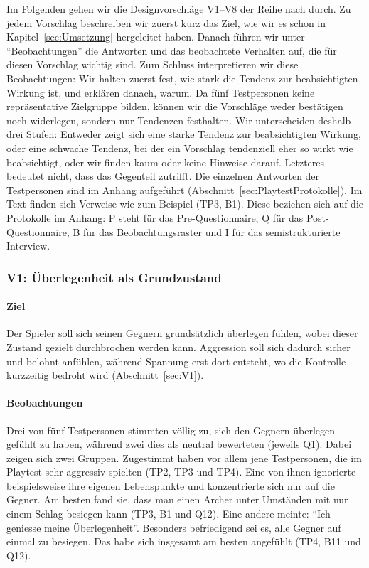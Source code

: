 \documentclass[../Main.tex]{subfiles}
\begin{document}
Im Folgenden gehen wir die Designvorschläge V1--V8 der Reihe nach durch. Zu jedem Vorschlag beschreiben wir zuerst kurz das Ziel, wie wir es schon in Kapitel~\ref{sec:Umsetzung} hergeleitet haben. Danach führen wir unter \enquote{Beobachtungen} die Antworten und das beobachtete Verhalten auf, die für diesen Vorschlag wichtig sind. Zum Schluss interpretieren wir diese Beobachtungen: Wir halten zuerst fest, wie stark die Tendenz zur beabsichtigten Wirkung ist, und erklären danach, warum. Da fünf Testpersonen keine repräsentative Zielgruppe bilden, können wir die Vorschläge weder bestätigen noch widerlegen, sondern nur Tendenzen festhalten. Wir unterscheiden deshalb drei Stufen: Entweder zeigt sich eine starke Tendenz zur beabsichtigten Wirkung, oder eine schwache Tendenz, bei der ein Vorschlag tendenziell eher so wirkt wie beabsichtigt, oder wir finden kaum oder keine Hinweise darauf. Letzteres bedeutet nicht, dass das Gegenteil zutrifft. Die einzelnen Antworten der Testpersonen sind im Anhang aufgeführt (Abschnitt~\ref{sec:PlaytestProtokolle}). Im Text finden sich Verweise wie zum Beispiel (TP3, B1). Diese beziehen sich auf die Protokolle im Anhang: P steht für das Pre-Questionnaire, Q für das Post-Questionnaire, B für das Beobachtungsraster und I für das semistrukturierte Interview.

\subsubsection{V1: Überlegenheit als Grundzustand}

\paragraph{Ziel}
Der Spieler soll sich seinen Gegnern grundsätzlich überlegen fühlen, wobei dieser Zustand gezielt durchbrochen werden kann. Aggression soll sich dadurch sicher und belohnt anfühlen, während Spannung erst dort entsteht, wo die Kontrolle kurzzeitig bedroht wird (Abschnitt~\ref{sec:V1}).

\paragraph{Beobachtungen}
Drei von fünf Testpersonen stimmten völlig zu, sich den Gegnern überlegen gefühlt zu haben, während zwei dies als neutral bewerteten (jeweils Q1). Dabei zeigen sich zwei Gruppen. Zugestimmt haben vor allem jene Testpersonen, die im Playtest sehr aggressiv spielten (TP2, TP3 und TP4). Eine von ihnen ignorierte beispielsweise ihre eigenen Lebenspunkte und konzentrierte sich nur auf die Gegner. Am besten fand sie, dass man einen Archer unter Umständen mit nur einem Schlag besiegen kann (TP3, B1 und Q12). Eine andere meinte: \enquote{Ich geniesse meine Überlegenheit}. Besonders befriedigend sei es, alle Gegner auf einmal zu besiegen. Das habe sich insgesamt am besten angefühlt (TP4, B11 und Q12).
\end{document}
